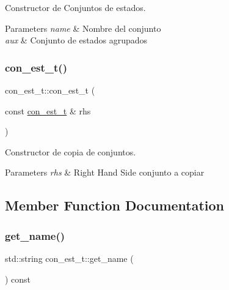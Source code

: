 Constructor de Conjuntos de estados. 


\begin{DoxyParams}{Parameters}
{\em name} & Nombre del conjunto \\
\hline
{\em aux} & Conjunto de estados agrupados \\
\hline
\end{DoxyParams}
\mbox{\label{classcon__est__t_a55a90d1c37eae69895ee0ff02d15eec7}} 
\subsubsection{\texorpdfstring{con\+\_\+est\+\_\+t()}{con\_est\_t()}\hspace{0.1cm}{\footnotesize\ttfamily [2/2]}}
{\footnotesize\ttfamily con\+\_\+est\+\_\+t\+::con\+\_\+est\+\_\+t (\begin{DoxyParamCaption}\item[{const \hyperlink{classcon__est__t}{con\+\_\+est\+\_\+t} \&}]{rhs }\end{DoxyParamCaption})}



Constructor de copia de conjuntos. 


\begin{DoxyParams}{Parameters}
{\em rhs} & Right Hand Side conjunto a copiar \\
\hline
\end{DoxyParams}


\subsection{Member Function Documentation}
\mbox{\label{classcon__est__t_a3529d902b7b1fed03bd7d6dc58adfa21}} 
\subsubsection{\texorpdfstring{get\+\_\+name()}{get\_name()}}
{\footnotesize\ttfamily std\+::string con\+\_\+est\+\_\+t\+::get\+\_\+name (\begin{DoxyParamCaption}{ }\end{DoxyParamCaption}) const\hspace{0.3cm}{\ttfamily [inline]}}




